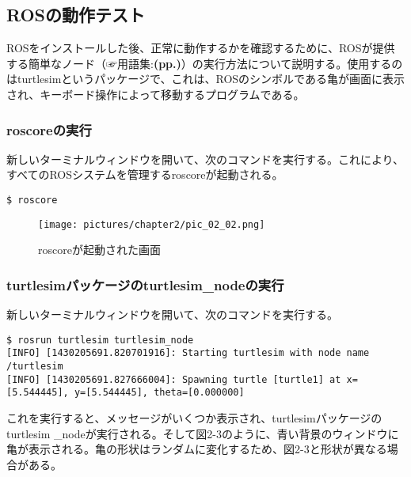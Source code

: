 \subsection{ROSの動作テスト}
\label{section:turtlesimtest}

ROSをインストールした後、正常に動作するかを確認するために、ROSが提供する簡単なノード（☞用語集:\textbf{(pp.\pageref{section:terms})}）の実行方法について説明する。使用するのはturtlesimというパッケージで、これは、ROSのシンボルである亀が画面に表示され、キーボード操作によって移動するプログラムである。

\subsubsection{roscoreの実行}

新しいターミナルウィンドウを開いて、次のコマンドを実行する。これにより、すべてのROSシステムを管理するroscoreが起動される。

\begin{lstlisting}[language=ROS]
$ roscore
\end{lstlisting}

\begin{figure}[h]
  \centering
  \texttt{[image: pictures/chapter2/pic\_02\_02.png]}
  \caption{roscoreが起動された画面}
\end{figure}

\subsubsection{turtlesimパッケージのturtlesim\_nodeの実行}

新しいターミナルウィンドウを開いて、次のコマンドを実行する。

\begin{lstlisting}[language=ROS]
$ rosrun turtlesim turtlesim_node
[INFO] [1430205691.820701916]: Starting turtlesim with node name /turtlesim
[INFO] [1430205691.827666004]: Spawning turtle [turtle1] at x=[5.544445], y=[5.544445], theta=[0.000000]
\end{lstlisting}

これを実行すると、メッセージがいくつか表示され、turtlesimパッケージのturtlesim \_nodeが実行される。そして図2-3のように、青い背景のウィンドウに亀が表示される。亀の形状はランダムに変化するため、図2-3と形状が異なる場合がある。

